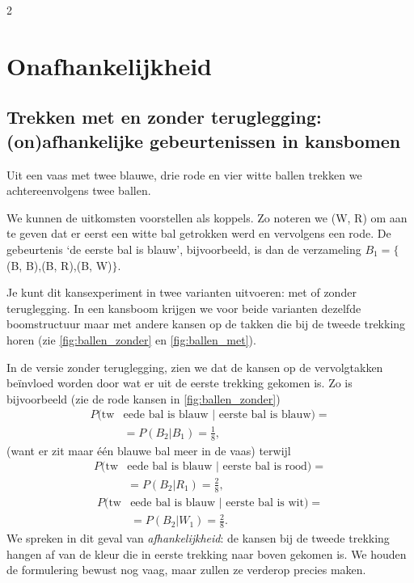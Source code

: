 \begin{multicols} {2}
\section{Onafhankelijkheid}

\subsection*{Trekken met en zonder teruglegging: (on)afhankelijke gebeurtenissen in kansbomen}

Uit een vaas met twee blauwe, drie rode en vier witte ballen trekken we achtereenvolgens twee ballen.

We kunnen de uitkomsten voorstellen als koppels. Zo noteren we (W, R) om aan te geven dat er eerst een witte bal getrokken werd en vervolgens een rode. De gebeurtenis ‘de eerste bal is blauw’, bijvoorbeeld, is dan de verzameling $B_1=\{$(B, B),(B, R),(B, W)$\}$.

Je kunt dit kansexperiment in twee varianten uitvoeren: met of zonder teruglegging. In een kansboom krijgen we voor beide varianten dezelfde boomstructuur maar met andere kansen op de takken die bij de tweede trekking horen (zie \autoref{fig:ballen_zonder}
 en \autoref{fig:ballen_met}).


In de versie zonder teruglegging, zien we dat de kansen op de vervolgtakken beïnvloed worden door wat er uit de eerste trekking gekomen is. Zo is bijvoorbeeld (zie de rode kansen in \autoref{fig:ballen_zonder})
\begin{equation*}
\begin{split}
P(\text{tw} & \text{eede bal is blauw | eerste bal is blauw})= \\
 & = P(B_2|B_1)=\frac{1}{8},
\end{split}
\end{equation*}
(want er zit maar één blauwe bal meer in de vaas) terwijl
\begin{equation*}
\begin{split}
P(\text{tw} & \text{eede bal is blauw | eerste bal is rood})= \\
 & = P(B_2|R_1)=\frac{2}{8},
\end{split}
\end{equation*}
\begin{equation*}
\begin{split}
P(\text{tw} & \text{eede bal is blauw | eerste bal is wit})= \\
 & = P(B_2|W_1)=\frac{2}{8}.
\end{split}
\end{equation*}
We spreken in dit geval van \emph{afhankelijkheid}: de kansen bij de tweede trekking hangen af van de kleur die in eerste trekking naar boven gekomen is. We houden de formulering bewust nog vaag, maar zullen ze verderop precies maken.


\end{multicols}
